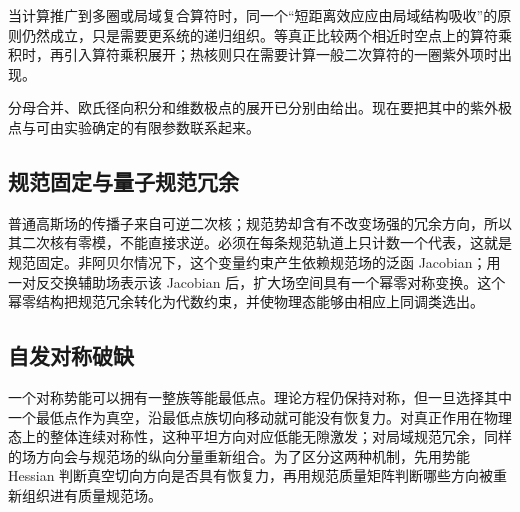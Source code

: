 当计算推广到多圈或局域复合算符时，同一个“短距离效应应由局域结构吸收”的原则仍然成立，只是需要更系统的递归组织。等真正比较两个相近时空点上的算符乘积时，再引入算符乘积展开；热核则只在需要计算一般二次算符的一圈紫外项时出现。

分母合并、欧氏径向积分和维数极点的展开已分别由给出。现在要把其中的紫外极点与可由实验确定的有限参数联系起来。








\subsection{规范固定与量子规范冗余}
普通高斯场的传播子来自可逆二次核；规范势却含有不改变场强的冗余方向，所以其二次核有零模，不能直接求逆。必须在每条规范轨道上只计数一个代表，这就是规范固定。非阿贝尔情况下，这个变量约束产生依赖规范场的泛函 Jacobian；用一对反交换辅助场表示该 Jacobian 后，扩大场空间具有一个幂零对称变换。这个幂零结构把规范冗余转化为代数约束，并使物理态能够由相应上同调类选出。


\subsection{自发对称破缺}
一个对称势能可以拥有一整族等能最低点。理论方程仍保持对称，但一旦选择其中一个最低点作为真空，沿最低点族切向移动就可能没有恢复力。对真正作用在物理态上的整体连续对称性，这种平坦方向对应低能无隙激发；对局域规范冗余，同样的场方向会与规范场的纵向分量重新组合。为了区分这两种机制，先用势能 Hessian 判断真空切向方向是否具有恢复力，再用规范质量矩阵判断哪些方向被重新组织进有质量规范场。



